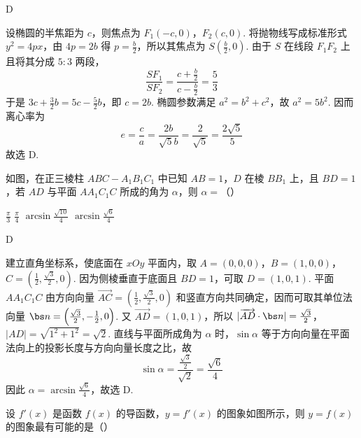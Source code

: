 \begin{answer}
D
\end{answer}

\begin{solution}
设椭圆的半焦距为 \(c\)，则焦点为 \(F_1(-c,0)\)，\(F_2(c,0)\). 将抛物线写成标准形式
\(y^2=4px\)，由 \(4p=2b\) 得 \(p=\frac b2\)，所以其焦点为 \(S\left(\frac b2,0\right)\).
由于 \(S\) 在线段 \(F_1F_2\) 上且将其分成 \(5:3\) 两段，
\[
\frac{SF_1}{SF_2}=\frac{c+\frac{b}{2}}{c-\frac{b}{2}}=\frac53
\]
于是 \(3c+\frac32b=5c-\frac52b\)，即 \(c=2b\). 椭圆参数满足
\(a^2=b^2+c^2\)，故 \(a^2=5b^2\). 因而离心率为
\[
e=\frac ca=\frac{2b}{\sqrt5b}=\frac2{\sqrt5}=\frac{2\sqrt5}{5}
\]
故选 D.
\end{solution}

\begin{problem}
如图，在正三棱柱 \(ABC-A_{1}B_{1}C_{1}\) 中已知 \(AB=1\)，\(D\) 在棱 \(BB_{1}\) 上，且 \(BD=1\)，若 \(AD\) 与平面 \(AA_{1}C_{1}C\) 所成的角为 \(\alpha\)，则 \(\alpha=\)（\quad）


\choices
    {\(\frac{\pi}{3}\)}
    {\(\frac{\pi}{4}\)}
    {\(\arcsin \frac{\sqrt{10}}{4}\)}
    {\(\arcsin \frac{\sqrt{6}}{4}\)}
\end{problem}

\begin{answer}
D
\end{answer}

\begin{solution}
建立直角坐标系，使底面在 \(xOy\) 平面内，取
\(A=(0,0,0)\)，\(B=(1,0,0)\)，\(C=\left(\frac12,\frac{\sqrt3}{2},0\right)\).
因为侧棱垂直于底面且 \(BD=1\)，可取 \(D=(1,0,1)\). 平面 \(AA_1C_1C\) 由方向向量
\(\overrightarrow{AC}=\left(\frac12,\frac{\sqrt3}{2},0\right)\) 和竖直方向共同确定，因而可取其单位法向量
\(\bs n=\left(\frac{\sqrt3}{2},-\frac12,0\right)\). 又
\(\overrightarrow{AD}=(1,0,1)\)，所以
\(|\overrightarrow{AD}\cdot\bs n|=\frac{\sqrt3}{2}\)，\(|AD|=\sqrt{1^2+1^2}=\sqrt2\).
直线与平面所成角为 \(\alpha\) 时，\(\sin\alpha\) 等于方向向量在平面法向上的投影长度与方向向量长度之比，故
\[
\sin\alpha=\frac{\frac{\sqrt3}{2}}{\sqrt2}=\frac{\sqrt6}{4}
\]
因此 \(\alpha=\arcsin\frac{\sqrt6}{4}\)，故选 D.
\end{solution}

\begin{problem}
设 \(f'(x)\) 是函数 \(f(x)\) 的导函数，\(y=f'(x)\) 的图象如图所示，则 \(y=f(x)\) 的图象最有可能的是（\quad）


    {}
    {}
    {}
\end{problem}

